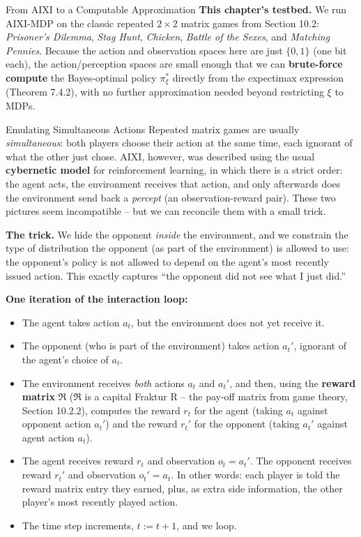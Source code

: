 \documentclass[aspectratio=169,10pt]{beamer}
\newcommand{\Rmat}{\mathfrak{R}}
\begin{document}
\begin{frame}[allowframebreaks]{From AIXI to a Computable Approximation}
  \bigskip
  \textbf{This chapter's testbed.} We run AIXI-MDP on the classic repeated
  $2\times2$ matrix games from Section 10.2: \emph{Prisoner's Dilemma},
  \emph{Stag Hunt}, \emph{Chicken}, \emph{Battle of the Sexes}, and
  \emph{Matching Pennies}. Because the action and observation spaces here
  are just $\{0,1\}$ (one bit each), the action/perception spaces are small
  enough that we can \textbf{brute-force compute} the Bayes-optimal policy
  $\pi_\xi^*$ directly from the expectimax expression (Theorem 7.4.2), with
  no further approximation needed beyond restricting $\xi$ to MDPs.
\end{frame}

\begin{frame}[allowframebreaks]{Emulating Simultaneous Actions}
  Repeated matrix games are usually \emph{simultaneous}: both players choose
  their action at the same time, each ignorant of what the other just chose.
  AIXI, however, was described using the usual \textbf{cybernetic model} for
  reinforcement learning, in which there is a strict order: the agent acts,
  the environment receives that action, and only afterwards does the
  environment send back a \emph{percept} (an observation-reward pair). These
  two pictures seem incompatible -- but we can reconcile them with a small
  trick.

  \bigskip
  \textbf{The trick.} We hide the opponent \emph{inside} the environment,
  and we constrain the type of distribution the opponent (as part of the
  environment) is allowed to use: the opponent's policy is not allowed to
  depend on the agent's most recently issued action. This exactly captures
  ``the opponent did not see what I just did.''

  \framebreak

  \textbf{One iteration of the interaction loop:}
  \begin{itemize}
    \item The agent takes action $a_t$, but the environment does not yet
      receive it.
    \item The opponent (who is part of the environment) takes action
      $a_t'$, ignorant of the agent's choice of $a_t$.
    \item The environment receives \emph{both} actions $a_t$ and $a_t'$,
      and then, using the \textbf{reward matrix} $\Rmat$ ($\Rmat$ is a
      capital Fraktur R -- the pay-off matrix from game theory, Section
      10.2.2), computes the reward $r_t$ for the agent (taking $a_t$ against
      opponent action $a_t'$) and the reward $r_t'$ for the opponent
      (taking $a_t'$ against agent action $a_t$).
    \item The agent receives reward $r_t$ and observation $o_t=a_t'$. The
      opponent receives reward $r_t'$ and observation $o_t'=a_t$. In other
      words: each player is told the reward matrix entry they earned, plus,
      as extra side information, the other player's most recently played
      action.
    \item The time step increments, $t:=t+1$, and we loop.
  \end{itemize}


\end{frame}
\end{document}
